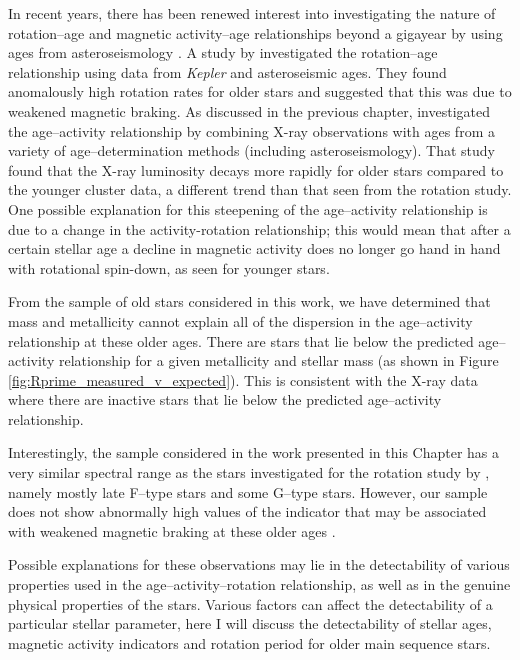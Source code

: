 In recent years, there has been renewed interest into investigating the nature of rotation--age and magnetic activity--age relationships beyond a gigayear by using ages from asteroseismology \citep{van_Saders_etal_2016,Booth_etal_2017}. A study by \citet{van_Saders_etal_2016} investigated the rotation--age relationship using data from \textit{Kepler} and asteroseismic ages. They found anomalously high rotation rates for older stars and suggested that this was due to weakened magnetic braking. As discussed in the previous chapter, \citet{Booth_etal_2017} investigated the age--activity relationship by combining X-ray observations with ages from a variety of age--determination methods (including asteroseismology). That study found that the X-ray luminosity decays more rapidly for older stars compared to the younger cluster data, a different trend than that seen from the rotation study. One possible explanation for this steepening of the age--activity relationship is due to a change in the activity-rotation relationship; this would mean that after a certain stellar age a decline in magnetic activity does no longer go hand in hand with rotational spin-down, as seen for younger stars.

From the sample of old stars considered in this work, we have determined that mass and metallicity cannot explain all of the dispersion in the age--activity relationship at these older ages. There are stars that lie below the predicted age--activity relationship for a given metallicity and stellar mass (as shown in Figure \ref{fig:Rprime_measured_v_expected}). This is consistent with the X-ray data \citep{Booth_etal_2017} where there are inactive stars that lie below the predicted age--activity relationship.

Interestingly, the sample considered in the work presented in this Chapter has a very similar spectral range as the stars investigated for the rotation study by \citet{van_Saders_etal_2016}, namely mostly late F--type stars and some G--type stars. However, our sample does not show abnormally high values of the \Rprime indicator that may be associated with weakened magnetic braking at these older ages \citep{van_Saders_etal_2016}.

Possible explanations for these observations may lie in the detectability of various properties used in the age--activity--rotation relationship, as well as in the genuine physical properties of the stars. Various factors can affect the detectability of a particular stellar parameter, here I will discuss the detectability of stellar ages, magnetic activity indicators and rotation period for older main sequence stars.

